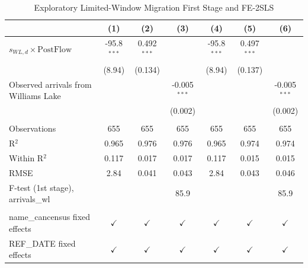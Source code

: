 \begin{table}[htbp]
   \caption{\label{tab:iv_limited_window} Exploratory Limited-Window Migration First Stage and FE-2SLS}
   \bigskip
   \centering
   \begin{tabular}{lcccccc}
      \toprule
                                            & (1)           & (2)           & (3)            & (4)           & (5)           & (6)\\  
      \midrule 
      $s_{WL,d} \times \mathrm{PostFlow}$   & -95.8$^{***}$ & 0.492$^{***}$ &                & -95.8$^{***}$ & 0.497$^{***}$ &   \\   
                                            & (8.94)        & (0.134)       &                & (8.94)        & (0.137)       &   \\   
      Observed arrivals from Williams Lake  &               &               & -0.005$^{***}$ &               &               & -0.005$^{***}$\\   
                                            &               &               & (0.002)        &               &               & (0.002)\\   
       \\
      Observations                          & 655           & 655           & 655            & 655           & 655           & 655\\  
      R$^2$                                 & 0.965         & 0.976         & 0.976          & 0.965         & 0.974         & 0.974\\  
      Within R$^2$                          & 0.117         & 0.017         & 0.017          & 0.117         & 0.015         & 0.015\\  
      RMSE                                  & 2.84          & 0.041         & 0.043          & 2.84          & 0.043         & 0.046\\  
      F-test (1st stage), arrivals\_wl      &               &               & 85.9           &               &               & 85.9\\  
       \\
      name\_cancensus fixed effects         & $\checkmark$  & $\checkmark$  & $\checkmark$   & $\checkmark$  & $\checkmark$  & $\checkmark$\\   
      REF\_DATE fixed effects               & $\checkmark$  & $\checkmark$  & $\checkmark$   & $\checkmark$  & $\checkmark$  & $\checkmark$\\   
      \bottomrule
   \end{tabular}
   

\end{table}
